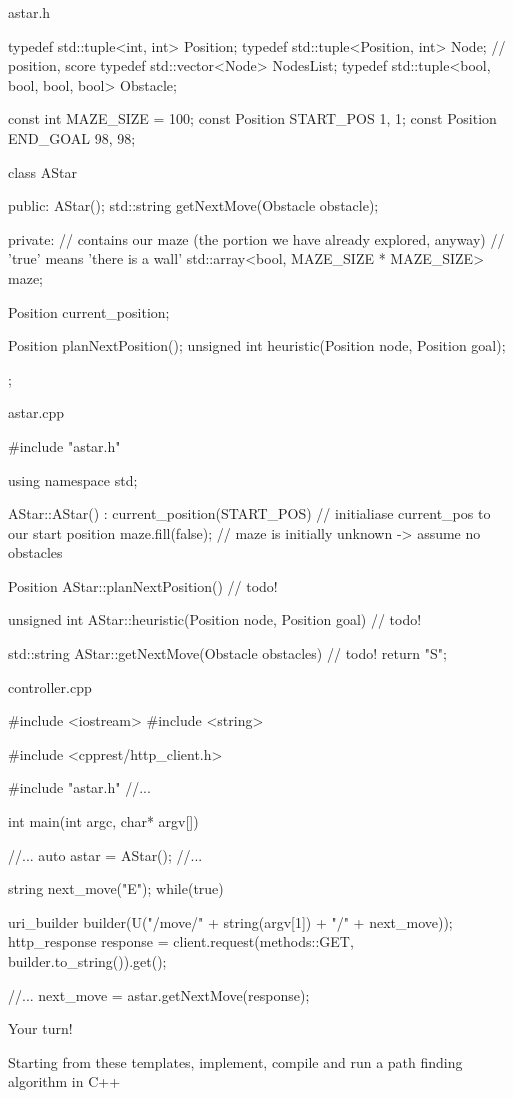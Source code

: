 \documentclass[compress]{beamer}
\begin{document}
\begin{frame}[fragile]{astar.h}
\begin{cppcode}
typedef std::tuple<int, int> Position;
typedef std::tuple<Position, int> Node; // {position, score}
typedef std::vector<Node> NodesList;
typedef std::tuple<bool, bool, bool, bool> Obstacle;

const int MAZE_SIZE = 100;
const Position START_POS {1, 1};
const Position END_GOAL {98, 98};

class AStar
{
public:
    AStar();
    std::string getNextMove(Obstacle obstacle);

private:
    // contains our maze (the portion we have already explored, anyway)
    // 'true' means 'there is a wall'
    std::array<bool, MAZE_SIZE * MAZE_SIZE> maze;

    Position current_position;

    Position planNextPosition();
    unsigned int heuristic(Position node, Position goal);
};
\end{cppcode}
\end{frame}
\begin{frame}[fragile]{astar.cpp}
\begin{cppcode}
#include "astar.h"

using namespace std;

AStar::AStar() :
    current_position(START_POS) // initialiase current_pos to our start position
{
    maze.fill(false); // maze is initially unknown -> assume no obstacles
}

Position AStar::planNextPosition()
{
    // todo!
}

unsigned int AStar::heuristic(Position node, Position goal)
{
    // todo!
}

std::string AStar::getNextMove(Obstacle obstacles)
{
    // todo!
    return "S";
}
\end{cppcode}
\end{frame}


\begin{frame}[fragile]{controller.cpp}
\begin{cppcode}
#include <iostream>
#include <string>

#include <cpprest/http_client.h>

#include "astar.h"
//...

int main(int argc, char* argv[])
{
    //...
    auto astar = AStar();
    //...

    string next_move("E");
    while(true) {
        uri_builder builder(U("/move/" + string(argv[1]) + "/" + next_move));
        http_response response = client.request(methods::GET, builder.to_string()).get();

        //...
        next_move = astar.getNextMove(response);
    }
}

\end{cppcode}
\end{frame}

\begin{frame}{Your turn!}
    \begin{center}
        Starting from these templates, implement, compile and run a path finding
        algorithm in C++
    \end{center}
\end{frame}
\end{document}
